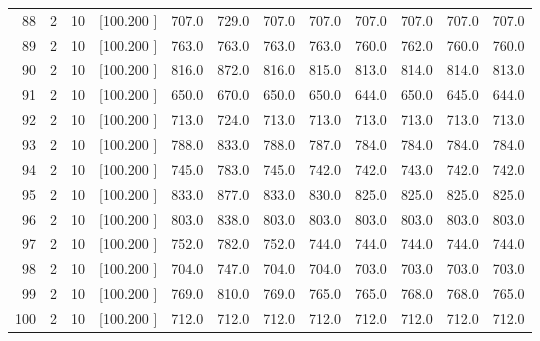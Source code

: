 \documentclass[12pt,a4paper]{article}
\begin{document}
\begin{center}
{\begin{tabular}{r r r r r r r r r r r r}
  88&  2& 10&[100.200   ]&   707.0&   729.0&   707.0&   707.0&   707.0&   707.0&   707.0&   707.0\\[-0.02in]
  89&  2& 10&[100.200   ]&   763.0&   763.0&   763.0&   763.0&   760.0&   762.0&   760.0&   760.0\\[-0.02in]
  90&  2& 10&[100.200   ]&   816.0&   872.0&   816.0&   815.0&   813.0&   814.0&   814.0&   813.0\\[-0.02in]
  91&  2& 10&[100.200   ]&   650.0&   670.0&   650.0&   650.0&   644.0&   650.0&   645.0&   644.0\\[-0.02in]
  92&  2& 10&[100.200   ]&   713.0&   724.0&   713.0&   713.0&   713.0&   713.0&   713.0&   713.0\\[-0.02in]
  93&  2& 10&[100.200   ]&   788.0&   833.0&   788.0&   787.0&   784.0&   784.0&   784.0&   784.0\\[-0.02in]
  94&  2& 10&[100.200   ]&   745.0&   783.0&   745.0&   742.0&   742.0&   743.0&   742.0&   742.0\\[-0.02in]
  95&  2& 10&[100.200   ]&   833.0&   877.0&   833.0&   830.0&   825.0&   825.0&   825.0&   825.0\\[-0.02in]
  96&  2& 10&[100.200   ]&   803.0&   838.0&   803.0&   803.0&   803.0&   803.0&   803.0&   803.0\\[-0.02in]
  97&  2& 10&[100.200   ]&   752.0&   782.0&   752.0&   744.0&   744.0&   744.0&   744.0&   744.0\\[-0.02in]
  98&  2& 10&[100.200   ]&   704.0&   747.0&   704.0&   704.0&   703.0&   703.0&   703.0&   703.0\\[-0.02in]
  99&  2& 10&[100.200   ]&   769.0&   810.0&   769.0&   765.0&   765.0&   768.0&   768.0&   765.0\\[-0.02in]
 100&  2& 10&[100.200   ]&   712.0&   712.0&   712.0&   712.0&   712.0&   712.0&   712.0&   712.0\\[-0.02in]

\hline
\end{tabular}}
\end{center}
\end{document}
